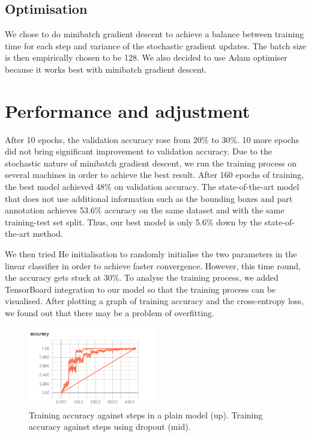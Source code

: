 \documentclass[letterpaper, 12pt]{article}
\begin{document}
\subsection{Optimisation}
We chose to do minibatch gradient descent to achieve a balance between training time for each step and
variance of the stochastic gradient updates. The batch size is then empirically chosen to be 128. We also
decided to use Adam optimiser because it works best with minibatch gradient descent.

\section{Performance and adjustment}
After 10 epochs, the validation accuracy rose from 20\% to 30\%. 10 more epochs did not bring significant
improvement to validation accuracy. Due to the stochastic nature of minibatch gradient descent, we run
the training process on several machines in order to achieve the best result. After 160 epochs of training,
the best model achieved 48\% on validation accuracy. The state-of-the-art model \cite{gavves2015local} that does not use
additional information such as the bounding boxes and part annotation achieves 53.6\% accuracy \cite{krause2015fine}
on the same dataset and with the same training-test set split. Thus, our best model is only 5.6\% down by
the state-of-the-art method.

We then tried He initialisation to randomly initialise the two parameters in the linear classifier in order to
achieve faster convergence. However, this time round, the accuracy gets stuck at 30\%. To analyse the training process,
we added TensorBoard integration to our model so that the training process can be visualised. After plotting a graph
of training accuracy and the cross-entropy loss, we found out that there may be a problem of overfitting.
\begin{figure}
    \begin{center}
        \includegraphics[width=0.5\textwidth]{training_accuracy}
        \caption{Training accuracy against steps in a plain model (up). Training accuracy against steps using dropout (mid).}
    \end{center}
\end{figure}
\end{document}
